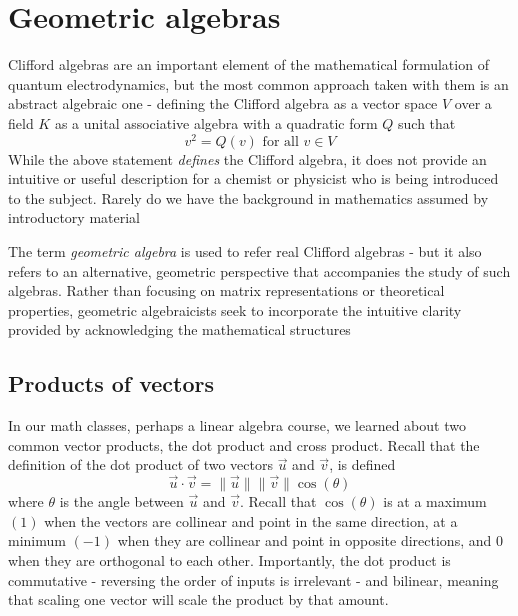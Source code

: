 \chapter{Geometric algebras}

Clifford algebras are an important element of the mathematical formulation of quantum
electrodynamics, but the most common approach taken with them is an abstract algebraic one -
defining the Clifford algebra as a vector space $V$ over a field $K$ as a unital associative algebra
with a quadratic form $Q$ such that
$$
v^2 = Q\left(v\right) \text{ for all } v \in V
$$
While the above statement \textit{defines} the Clifford algebra, it does not provide an intuitive or
useful description for a chemist or physicist who is being introduced to the subject. Rarely do we
have the background in mathematics assumed by introductory material

The term \textit{geometric algebra} is used to refer real Clifford algebras - but it also refers to
an alternative, geometric perspective that accompanies the study of such algebras. Rather than
focusing on matrix representations or theoretical properties, geometric algebraicists seek to
incorporate the intuitive clarity provided by acknowledging the mathematical structures

\section{Products of vectors}

In our math classes, perhaps a linear algebra course, we learned about two common vector products,
the dot product and cross product. Recall that the definition of the dot product of two vectors
$\vec{u}$ and $\vec{v}$, is defined
\begin{equation}
\vec{u} \cdot \vec{v} = \lVert\vec{u}\rVert \lVert\vec{v}\rVert \cos\left(\theta\right)
\end{equation}
where $\theta$ is the angle between $\vec{u}$ and $\vec{v}$. Recall that $\cos\left(\theta\right)$
is at a maximum $\left(1\right)$ when the vectors are collinear and point in the same direction, at
a minimum $\left(-1\right)$ when they are collinear and point in opposite directions, and $0$ when 
they are orthogonal to each other. Importantly, the dot product is commutative - reversing the order
of inputs is irrelevant - and bilinear, meaning that scaling one vector will scale the product by
that amount.

